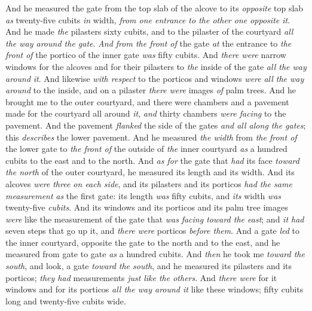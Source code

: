 \begin{biblechapter}
\verse And he measured the gate from the top slab of the alcove to its \textit{opposite} top slab \textit{as} twenty-five cubits \textit{in} width, \textit{from one entrance to the other one opposite it}.
\verse And he made \textit{the} pilasters sixty cubits, and to the pilaster of the courtyard \textit{all the way around the gate}.
\verse \textit{And from the front of} the gate \textit{at} the entrance to \textit{the front of} the portico of the inner gate \textit{was} fifty cubits.
\verse And \textit{there were} narrow windows for the alcoves and for their pilasters to \textit{the} inside of the gate \textit{all the way around} \textit{it}. And likewise \textit{with respect} to the porticos and windows \textit{were} \textit{all the way around} to the inside, and on a pilaster \textit{there were} images \textit{of} palm trees.
 And he brought me to the outer courtyard, and there were chambers and a pavement made for the courtyard all around \textit{it}, \textit{and} thirty chambers \textit{were facing} to the pavement.
\verse And the pavement \textit{flanked} the side of the gates \textit{and all along the gates}; this \textit{describes} the lower pavement.
\verse And he measured \textit{the width} from \textit{the front of} the lower gate to \textit{the front of} the outside of \textit{the} inner courtyard \textit{as} a hundred cubits to the east and to the north.
 And \textit{as for} the gate that \textit{had} its face \textit{toward the north} of the outer courtyard, he measured its length and its width.
\verse And its alcoves \textit{were} \textit{three on each side}, and its pilasters and its porticos \textit{had the same measurement} \textit{as} the first gate: its length \textit{was} fifty cubits, and \textit{its} width \textit{was} twenty-five \textit{cubits}.
\verse And its windows and its porticos and its palm tree images \textit{were} like the measurement of the gate that \textit{was} \textit{facing toward the east}; and \textit{it had} seven steps that go up it, and \textit{there were} porticos \textit{before them}.
\verse And a gate \textit{led} to the inner courtyard, opposite the gate to the north and to the east, and he measured from gate to gate \textit{as} a hundred cubits.
 And \textit{then} he took me \textit{toward the south}, and look, a gate \textit{toward the south}, and he measured its pilasters and its porticos; \textit{they had} measurements \textit{just} \textit{like the others}.
\verse And \textit{there were} for it windows and for its porticos \textit{all the way around it} like these windows; fifty cubits long and twenty-five cubits wide.

\end{biblechapter}
